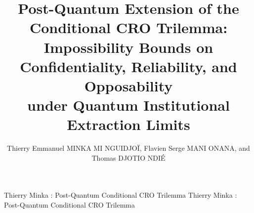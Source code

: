 \documentclass{ieeeaccess}
\begin{document}

\title{Post-Quantum Extension of the Conditional CRO Trilemma:\\
Impossibility Bounds on Confidentiality, Reliability, and Opposability\\
under Quantum Institutional Extraction Limits}

\author{
Thierry Emmanuel \uppercase{Minka Mi Nguidjoï},
Flavien Serge \uppercase{Mani Onana}, and
Thomas \uppercase{Djotio Ndié}
}
\address[1]{Laboratory of Mathematical Engineering and Information Systems, National Advanced School of Engineering, University of Yaoundé I, Cameroon (e-mail: minkathierry@gmail.com, serge.mani@digitworldacademy.com, tdjotio@gmail.com)}

\address[2]{Supreme State Audit Office, Yaoundé, Cameroon (e-mail: minkathierry@gmail.com)}

\markboth
{Thierry Minka \headeretal: Post-Quantum Conditional CRO Trilemma}
{Thierry Minka \headeretal: Post-Quantum Conditional CRO Trilemma}

\end{document}
